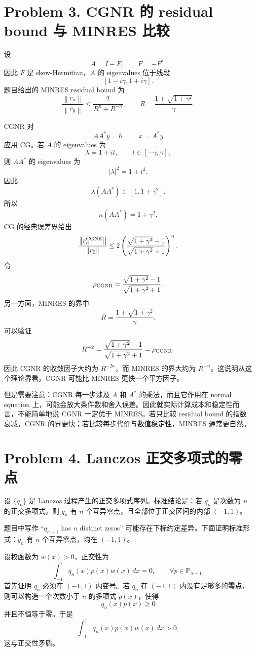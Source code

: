 \documentclass[11pt]{ctexart}
\newcommand{\norm}[1]{\left\lVert #1 \right\rVert}
\begin{document}
\section*{Problem 3. CGNR 的 residual bound 与 MINRES 比较}

设
\[
A=I-F, \qquad F=-F^*.
\]
因此 $F$ 是 skew-Hermitian，$A$ 的 eigenvalues 位于线段
\[
[1-i\gamma,1+i\gamma].
\]
题目给出的 MINRES residual bound 为
\[
\frac{\norm{r_n}}{\norm{r_0}}\le \frac{2}{R^n+R^{-n}},
\qquad
R=\frac{1+\sqrt{1+\gamma^2}}{\gamma}.
\]

CGNR 对
\[
AA^*y=b, \qquad x=A^*y
\]
应用 CG。若 $A$ 的 eigenvalues 为
\[
\lambda=1+i t, \qquad t\in[-\gamma,\gamma],
\]
则 $AA^*$ 的 eigenvalues 为
\[
|\lambda|^2=1+t^2.
\]
因此
\[
\lambda(AA^*)\subset [1,1+\gamma^2].
\]
所以
\[
\kappa(AA^*)=1+\gamma^2.
\]
CG 的经典误差界给出
\[
\frac{\norm{r_n^{\rm CGNR}}}{\norm{r_0}}
\le
2\left(\frac{\sqrt{1+\gamma^2}-1}{\sqrt{1+\gamma^2}+1}\right)^n.
\]
令
\[
\rho_{\rm CGNR}=\frac{\sqrt{1+\gamma^2}-1}{\sqrt{1+\gamma^2}+1}.
\]
另一方面，MINRES 的界中
\[
R=\frac{1+\sqrt{1+\gamma^2}}{\gamma}.
\]
可以验证
\[
R^{-2}=\frac{\sqrt{1+\gamma^2}-1}{\sqrt{1+\gamma^2}+1}=\rho_{\rm CGNR}.
\]
因此 CGNR 的收敛因子大约为 $R^{-2n}$，而 MINRES 的界大约为 $R^{-n}$。这说明从这个理论界看，CGNR 可能比 MINRES 更快一个平方因子。

但是需要注意：CGNR 每一步涉及 $A$ 和 $A^*$ 的乘法，而且它作用在 normal equation 上，可能会放大条件数和舍入误差。因此就实际计算成本和稳定性而言，不能简单地说 CGNR 一定优于 MINRES。若只比较 residual bound 的指数衰减，CGNR 的界更快；若比较每步代价与数值稳定性，MINRES 通常更自然。

\section*{Problem 4. Lanczos 正交多项式的零点}

设 $\{q_n\}$ 是 Lanczos 过程产生的正交多项式序列。标准结论是：若 $q_n$ 是次数为 $n$ 的正交多项式，则 $q_n$ 有 $n$ 个互异零点，且全部位于正交区间的内部 $(-1,1)$。

题目中写作 ``$q_{n+1}$ has $n$ distinct zeros'' 可能存在下标约定差异。下面证明标准形式：$q_n$ 有 $n$ 个互异零点，均在 $(-1,1)$。

设权函数为 $w(x)>0$，正交性为
\[
\int_{-1}^1 q_n(x)p(x)w(x)\,dx=0,
\qquad \forall p\in \mathbb{P}_{n-1}.
\]
首先证明 $q_n$ 必须在 $(-1,1)$ 内变号。若 $q_n$ 在 $(-1,1)$ 内没有足够多的零点，则可以构造一个次数小于 $n$ 的多项式 $p(x)$，使得
\[
q_n(x)p(x)\ge 0
\]
并且不恒等于零。于是
\[
\int_{-1}^1 q_n(x)p(x)w(x)\,dx>0,
\]
这与正交性矛盾。
\end{document}
